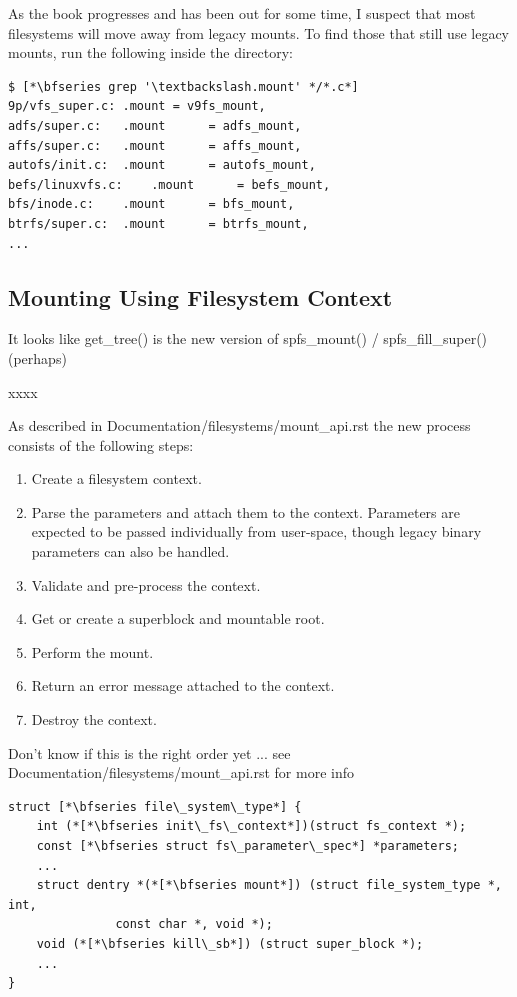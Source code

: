 \noindent
As the book progresses and has been out for some time, I suspect that most filesystems will move away from legacy mounts. To find those that still use legacy mounts, run the following inside the  directory:

\begin{lstlisting}
$ [*\bfseries grep '\textbackslash.mount' */*.c*]
9p/vfs_super.c:	.mount = v9fs_mount,
adfs/super.c:	.mount		= adfs_mount,
affs/super.c:	.mount		= affs_mount,
autofs/init.c:	.mount		= autofs_mount,
befs/linuxvfs.c:	.mount		= befs_mount,
bfs/inode.c:	.mount		= bfs_mount,
btrfs/super.c:	.mount		= btrfs_mount,
...
\end{lstlisting}


\subsection{Mounting Using Filesystem Context}

It looks like get\_tree() is the new version of spfs\_mount() / spfs\_fill\_super() (perhaps)

xxxx

As described in Documentation/filesystems/mount\_api.rst the new process consists of the following steps:

\begin{enumerate}
	\item Create a filesystem context.
	\item Parse the parameters and attach them to the context.  Parameters are expected to be passed individually 
		from user-space, though legacy binary parameters can also be handled.
	\item Validate and pre-process the context.
	\item Get or create a superblock and mountable root.
	\item Perform the mount.
	\item Return an error message attached to the context.
	\item Destroy the context.
\end{enumerate}

Don't know if this is the right order yet ... see Documentation/filesystems/mount\_api.rst for more info

\begin{lstlisting}
struct [*\bfseries file\_system\_type*] {
    int (*[*\bfseries init\_fs\_context*])(struct fs_context *);
    const [*\bfseries struct fs\_parameter\_spec*] *parameters;
    ...
    struct dentry *(*[*\bfseries mount*]) (struct file_system_type *, int,
               const char *, void *);
    void (*[*\bfseries kill\_sb*]) (struct super_block *);
    ...
}
\end{lstlisting}

